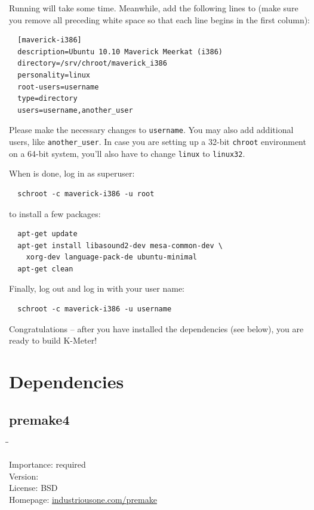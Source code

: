 Running  will take some time.  Meanwhile, add the
following lines to  (make sure you
remove all preceding white space so that each line begins in the first
column):

\begin{verbatim}
  [maverick-i386]
  description=Ubuntu 10.10 Maverick Meerkat (i386)
  directory=/srv/chroot/maverick_i386
  personality=linux
  root-users=username
  type=directory
  users=username,another_user
\end{verbatim}

Please make the necessary changes to \texttt{username}.  You may also
add additional users, like \texttt{another\_user}.  In case you are
setting up a 32-bit \texttt{chroot} environment on a 64-bit system,
you'll also have to change \texttt{linux} to \texttt{linux32}.

When  is done, log in as superuser:

\begin{verbatim}
  schroot -c maverick-i386 -u root
\end{verbatim}

to install a few packages:

\begin{verbatim}
  apt-get update
  apt-get install libasound2-dev mesa-common-dev \
    xorg-dev language-pack-de ubuntu-minimal
  apt-get clean
\end{verbatim}

Finally, log out and log in with your user name:

\begin{verbatim}
  schroot -c maverick-i386 -u username
\end{verbatim}

Congratulations -- after you have installed the dependencies (see
below), you are ready to build K-Meter!

\section{Dependencies}

\subsection{premake4}

\begin{tabbing}
  \hspace*{6em}\=\=\kill

  Importance:  \> required \\
  Version:      \\
  License:     \> BSD \\
  Homepage:    \> \href{http://industriousone.com/premake}{industriousone.com/premake}
\end{tabbing}

